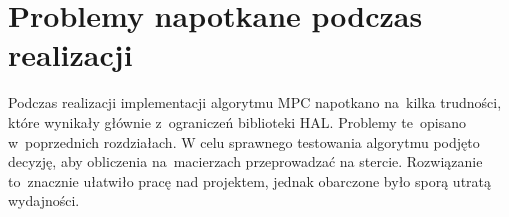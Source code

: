 \section{Problemy napotkane podczas realizacji} \label{sec:problems}
Podczas realizacji implementacji algorytmu MPC napotkano na~kilka trudności, które wynikały
głównie z~ograniczeń biblioteki HAL. Problemy te~opisano w~poprzednich rozdziałach.
W celu sprawnego testowania algorytmu podjęto decyzję, aby obliczenia na~macierzach przeprowadzać
na stercie. Rozwiązanie to~znacznie ułatwiło pracę nad projektem, jednak obarczone było 
sporą utratą wydajności. 
